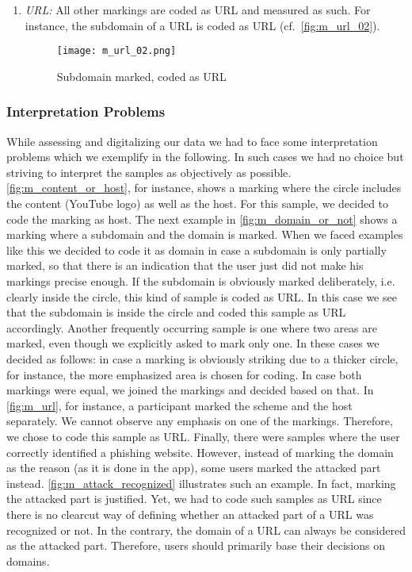 \begin{enumerate}
	\item\textit{URL:} All other markings are coded as URL and measured as such. For instance, the subdomain of a URL is coded as URL (cf.~\autoref{fig:m_url_02}).
	\begin{figure}[H]
	\centering
	\texttt{[image: m\_url\_02.png]}
	\caption{Subdomain marked, coded as URL}
	\label{fig:m_url_02}
	\end{figure}
\end{enumerate}

\subsubsection{Interpretation Problems}
\label{s:intprobs}
While assessing and digitalizing our data we had to face some interpretation problems which we exemplify in the following.
In such cases we had no choice but striving to interpret the samples as objectively as possible.
\autoref{fig:m_content_or_host}, for instance, shows a marking where the circle includes the content (YouTube logo) as well as the host. 
For this sample, we decided to code the marking as host.
The next example in \autoref{fig:m_domain_or_not} shows a marking where a subdomain and the domain is marked. 
When we faced examples like this we decided to code it as domain in case a subdomain is only partially marked, so that there is an indication that the user just did not make his markings precise enough.
If the subdomain is obviously marked deliberately, i.e. clearly inside the circle, this kind of sample is coded as URL.
In this case we see that the subdomain is inside the circle and coded this sample as URL accordingly.
Another frequently occurring sample is one where two areas are marked, even though we explicitly asked to mark only one.
In these cases we decided as follows: in case a marking is obviously striking due to a thicker circle, for instance, the more emphasized area is chosen for coding.
In case both markings were equal, we joined the markings and decided based on that.
In \autoref{fig:m_url}, for instance, a participant marked the scheme and the host separately. 
We cannot observe any emphasis on one of the markings.
Therefore, we chose to code this sample as URL.
Finally, there were samples where the user correctly identified a phishing website.
However, instead of marking the domain as the reason (as it is done in the app), some users marked the attacked part instead.
\autoref{fig:m_attack_recognized} illustrates such an example.
In fact, marking the attacked part is justified. 
Yet, we had to code such samples as URL since there is no clearcut way of defining whether an attacked part of a URL was recognized or not.
In the contrary, the domain of a URL can always be considered as the attacked part. Therefore, users should primarily base their decisions on domains.

